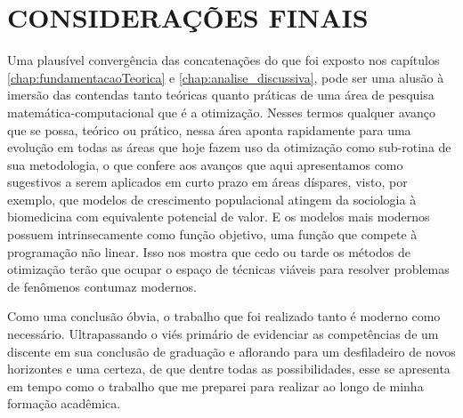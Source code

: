 \section{CONSIDERAÇÕES FINAIS}
\label{sec:consideracoesFinais}

Uma plausível convergência das concatenações do que foi exposto nos capítulos
\ref{chap:fundamentacaoTeorica} e \ref{chap:analise_discussiva}, pode ser uma
alusão à imersão das contendas tanto teóricas quanto práticas de uma área de
pesquisa matemática-computacional que é a otimização. Nesses termos qualquer
avanço que se possa, teórico ou prático, nessa área aponta rapidamente para
uma evolução em todas as áreas que hoje fazem uso da otimização como
sub-rotina de sua metodologia, o que confere aos avanços que aqui apresentamos
como sugestivos a serem aplicados em curto prazo em áreas díspares, visto, por
exemplo, que modelos de crescimento populacional atingem da sociologia à
biomedicina com equivalente potencial de valor. E os modelos mais modernos
possuem intrinsecamente como função objetivo, uma função que compete à
programação não linear. Isso nos mostra que cedo ou tarde os métodos de
otimização terão que ocupar o espaço de técnicas viáveis para resolver
problemas de fenômenos contumaz modernos.

Como uma conclusão óbvia, o trabalho que foi realizado tanto é moderno como
necessário. Ultrapassando o viés primário de evidenciar as competências de um
discente em sua conclusão de graduação e aflorando para um desfiladeiro de
novos horizontes e uma certeza, de que dentre todas as possibilidades, esse se
apresenta em tempo como o trabalho que me preparei para realizar ao longo de
minha formação acadêmica.